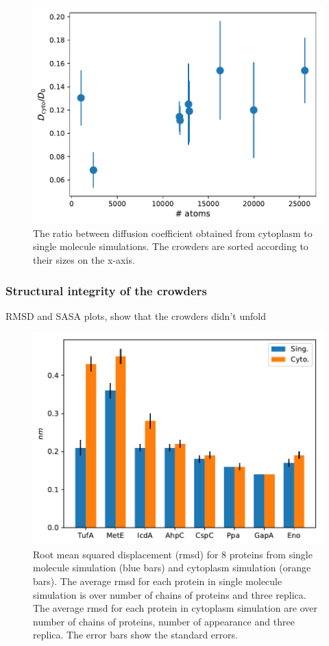 \documentclass[journal=jacsat,manuscript=article]{achemso}
\begin{document}
\begin{figure}
\includegraphics[scale=0.6]{diff_cyto_over_singles.pdf}
\caption{The ratio between diffusion coefficient obtained from cytoplasm to single molecule simulations. The crowders are sorted according to their sizes on the x-axis.}
\end{figure}



\subsubsection{Structural integrity of the crowders}
RMSD and SASA plots, show that the crowders didn't unfold


\begin{figure}
\includegraphics[scale=0.6]{rmsd.pdf}
\caption{Root mean squared displacement (rmsd) for 8 proteins from single molecule simulation (blue bars) and cytoplasm simulation (orange bars). The average rmsd for each protein in single molecule simulation is over number of chains of proteins and three replica. The average rmsd for each protein in cytoplasm simulation are over number of chains of proteins, number of appearance and three replica. The error bars show the standard errors.}
\end{figure}
\end{document}
